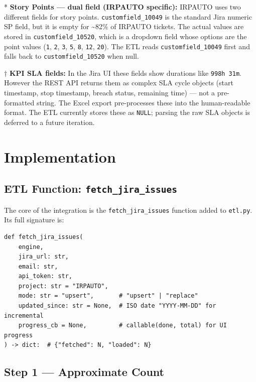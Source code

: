 \documentclass[12pt, a4paper]{article}
\begin{document}
\begin{longtable}{>{\small}p{3.6cm} >{\ttfamily\small}p{3.2cm} >{\small}p{3.0cm} >{\ttfamily\small}p{3.0cm}}
\end{longtable}

\noindent
* \textbf{Story Points — dual field (IRPAUTO specific):} IRPAUTO uses two different fields
for story points. \texttt{customfield\_10049} is the standard Jira numeric SP field, but it
is empty for \textasciitilde82\% of IRPAUTO tickets. The actual values are stored in
\texttt{customfield\_10520}, which is a dropdown field whose options are the point values
(\texttt{1}, \texttt{2}, \texttt{3}, \texttt{5}, \texttt{8}, \texttt{12}, \texttt{20}).
The ETL reads \texttt{customfield\_10049} first and falls back to \texttt{customfield\_10520}
when null.

\vspace{0.4cm}
\noindent
$\dagger$ \textbf{KPI SLA fields:} In the Jira UI these fields show durations like
\texttt{998h 31m}. However the REST API returns them as complex SLA cycle objects
(start timestamp, stop timestamp, breach status, remaining time) — not a pre-formatted
string. The Excel export pre-processes these into the human-readable format. The ETL
currently stores these as \texttt{NULL}; parsing the raw SLA objects is deferred to a
future iteration.

\section{Implementation}

\subsection{ETL Function: \texttt{fetch\_jira\_issues}}

The core of the integration is the \texttt{fetch\_jira\_issues} function added to
\texttt{etl.py}. Its full signature is:

\begin{lstlisting}[style=python, caption={Function signature}]
def fetch_jira_issues(
    engine,
    jira_url: str,
    email: str,
    api_token: str,
    project: str = "IRPAUTO",
    mode: str = "upsert",       # "upsert" | "replace"
    updated_since: str = None,  # ISO date "YYYY-MM-DD" for incremental
    progress_cb = None,         # callable(done, total) for UI progress
) -> dict:  # {"fetched": N, "loaded": N}
\end{lstlisting}

\subsection{Step 1 — Approximate Count}
\end{document}
